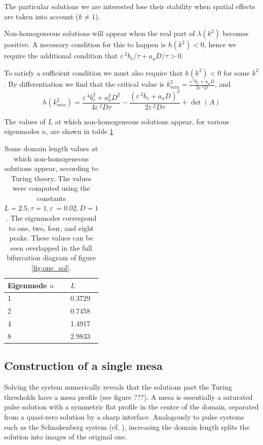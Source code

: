 \documentclass[a4paper,10pt]{article}
\newcommand{\lA}{\ensuremath{\lambda}}
\newcommand{\Ep}{\ensuremath{\varepsilon\,}}
\begin{document}
The particular solutions we are interested lose their stability when spatial effects are taken into account ($k\neq 1$). 

Non-homogeneous solutions will appear when the real part of $\lA(k^2)$ becomes positive. A necessary condition for this to happen is $h(k^2)<0$, hence we require the additional condition that $\Ep^2b_v/\tau + a_uD/\tau>0$.

To satisfy a sufficient condition we must also require that $h(k^2)<0$ for some $k^2$. By differentiation we find that the critical value is $k^2_{min} = \frac{\Ep^2b_v + a_uD}{2\Ep^2D}$, and
% 
$$
h(k^2_{min}) = \frac{\Ep^4b_v^2 + a_u^2D^2}{4\Ep^2D\tau} - \frac{\left(\Ep^2b_v + a_uD\right)^2}{2\Ep^2D\tau} + \det(A)
$$

The values of $L$ at which non-homogeneous solutions appear, for various eigenmodes $n$, are shown in table \ref{tab:L_turing}
% 
\begin{table}[h]
\begin{center}
\begin{tabular}{|l|l|}
\hline
\large{Eigenmode $n$} & \large{$L$}\\
\hline
1 & 0.3729 \\
2 & 0.7458 \\
4 & 1.4917 \\
8 & 2.9833 \\
\hline
\end{tabular}
\end{center}
\label{tab:L_turing}
\caption{Some domain length values at which non-homogeneous solutions appear, according to Turing theory. The values were computed using the constants $L=2.5,\tau=1,\Ep=0.02,D=1$. The eigenmodes correspond to one, two, four, and eight peaks. These values can be seen overlapped in the full bifurcation diagram of figure \ref{fig:one_sol}.}
\end{table}
% 

\subsection{Construction of a single mesa}

Solving the system numerically reveals that the solutions past the Turing thresholds have a mesa profile (see figure ???). A mesa is essentially a saturated pulse solution with a symmetric flat profile in the centre of the domain, separated from a quasi-zero solution by a sharp interface. Analogously to pulse systems such as the Schnakenberg system (cf. \cite{schnakenberg_simple_1979}), increasing the domain length splits the solution into images of the original one.
\end{document}
